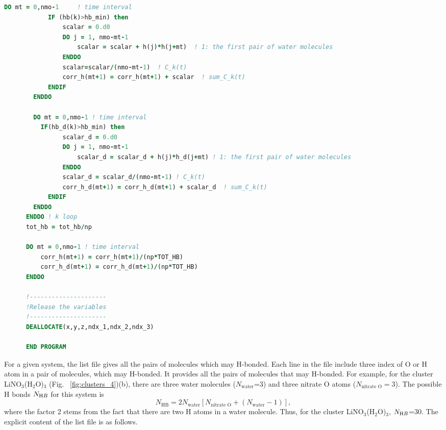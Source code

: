 \begin{lstlisting}[language=fortran]
        DO mt = 0,nmo-1     ! time interval
            IF (hb(k)>hb_min) then
                scalar = 0.d0
                DO j = 1, nmo-mt-1
                    scalar = scalar + h(j)*h(j+mt)  ! 1: the first pair of water molecules
                ENDDO
                scalar=scalar/(nmo-mt-1)  ! C_k(t)
                corr_h(mt+1) = corr_h(mt+1) + scalar  ! sum_C_k(t)
            ENDIF
        ENDDO

        DO mt = 0,nmo-1 ! time interval
          IF(hb_d(k)>hb_min) then
                scalar_d = 0.d0
                DO j = 1, nmo-mt-1
                    scalar_d = scalar_d + h(j)*h_d(j+mt) ! 1: the first pair of water molecules
                ENDDO
                scalar_d = scalar_d/(nmo-mt-1) ! C_k(t)
                corr_h_d(mt+1) = corr_h_d(mt+1) + scalar_d  ! sum_C_k(t)
            ENDIF
        ENDDO
      ENDDO ! k loop 
      tot_hb = tot_hb/np

      DO mt = 0,nmo-1 ! time interval
          corr_h(mt+1) = corr_h(mt+1)/(np*TOT_HB)  
          corr_h_d(mt+1) = corr_h_d(mt+1)/(np*TOT_HB)  
      ENDDO
      
      !---------------------
      !Release the variables
      !---------------------
      DEALLOCATE(x,y,z,ndx_1,ndx_2,ndx_3)          

      END PROGRAM
\end{lstlisting}
%
For a given system, the list file gives all the pairs of molecules which may H-bonded. Each line in the file 
include three index of O or H atom in a pair of molecules, which may H-bonded. It provides all the pairs of molecules 
that may H-bonded. For example, for the cluster LiNO$_3$(H$_2$O)$_3$ (Fig. ~\ref{fig:clusters_4})(b), there are three 
water molecules ($N_{\text{water}}$=3) and three nitrate O atoms ($N_{\text {nitrate O}}=3$).  The possible H bonds 
$N_{\text HB}$ for this system is
\begin{equation}
N_{\text{HB}}=2N_{\text{water}} [N_{\text {nitrate O}}+ (N_{\text{water}}-1)],
\label{N_HB}
\end{equation}
where the factor 2 stems from the fact that there are two H atoms in a water molecule.
Thus, for the cluster LiNO$_3$(H$_2$O)$_3$, $N_{\text HB}$=30. The explicit content of the list file is as follows.
